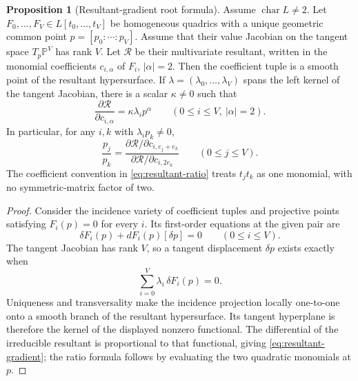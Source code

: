 \documentclass[11pt,a4paper]{article}
\theoremstyle{definition}
\newtheorem{proposition}[theorem]{Proposition}
\theoremstyle{remark}
\newcommand{\PP}{\mathbb P}
\begin{document}
\begin{proposition}[Resultant-gradient root formula]\label{prop:resultant-gradient}
Assume $\operatorname{char}L\ne2$.  Let $F_0,\ldots,F_V\in L[t_0,\ldots,t_V]$ be homogeneous quadrics with a unique geometric common point $p=[p_0:\cdots:p_V]$.  Assume that their value Jacobian on the tangent space $T_p\PP^V$ has rank $V$.  Let $\mathcal R$ be their multivariate resultant, written in the monomial coefficients $c_{i,\alpha}$ of $F_i$, $|\alpha|=2$.  Then the coefficient tuple is a smooth point of the resultant hypersurface.  If $\lambda=(\lambda_0,\ldots,\lambda_V)$ spans the left kernel of the tangent Jacobian, there is a scalar $\kappa\ne0$ such that
\begin{equation}\label{eq:resultant-gradient}
\frac{\partial\mathcal R}{\partial c_{i,\alpha}}
=\kappa\lambda_i p^\alpha
\qquad(0\le i\le V,\ |\alpha|=2).
\end{equation}
In particular, for any $i,k$ with $\lambda_i p_k\ne0$,
\begin{equation}\label{eq:resultant-ratio}
\frac{p_j}{p_k}
=
\frac{\partial\mathcal R/\partial c_{i,e_j+e_k}}
     {\partial\mathcal R/\partial c_{i,2e_k}}
\qquad(0\le j\le V).
\end{equation}
The coefficient convention in \eqref{eq:resultant-ratio} treats $t_jt_k$ as one monomial, with no symmetric-matrix factor of two.
\end{proposition}

\begin{proof}
Consider the incidence variety of coefficient tuples and projective points satisfying $F_i(p)=0$ for every $i$.  Its first-order equations at the given pair are
\[
\delta F_i(p)+dF_i(p)[\delta p]=0\qquad(0\le i\le V).
\]
The tangent Jacobian has rank $V$, so a tangent displacement $\delta p$ exists exactly when
\[
\sum_{i=0}^V\lambda_i\,\delta F_i(p)=0.
\]
Uniqueness and transversality make the incidence projection locally one-to-one onto a smooth branch of the resultant hypersurface.  Its tangent hyperplane is therefore the kernel of the displayed nonzero functional.  The differential of the irreducible resultant is proportional to that functional, giving \eqref{eq:resultant-gradient}; the ratio formula follows by evaluating the two quadratic monomials at $p$.
\end{proof}
\end{document}
